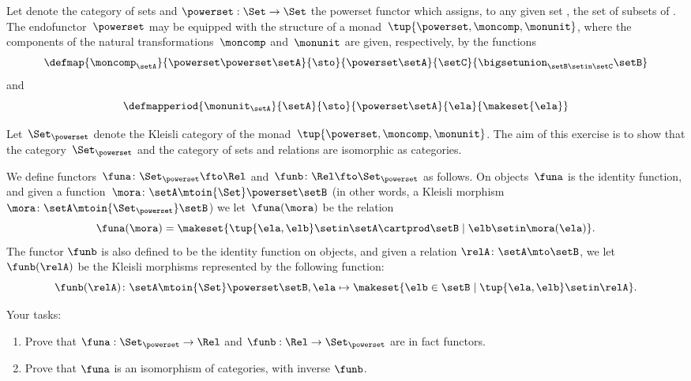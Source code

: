 \begin{gradedexercise}
    \label{ex:HwkRelKleisli}

    Let \Set denote the category of sets and $\powerset : \Set \to \Set$ the powerset functor which assigns, to any given set \setA, the set of subsets of \setA.
    The endofunctor~$\powerset$ may be equipped with the structure of a monad~$\tup{\powerset, \moncomp, \monunit}$, where the components of the natural transformations~$\moncomp$ and~$\monunit$ are given, respectively, by the functions
    \begin{equation}
        \defmap{\moncomp_{\setA}}{\powerset \powerset \setA}{\sto}{\powerset \setA}{\setC}{\bigsetunion_{\setB \setin \setC} \setB}
    \end{equation}
    and
    \begin{equation}
        \defmapperiod{\monunit_{\setA}}{\setA}{\sto}{\powerset \setA}{\ela}{\makeset{\ela}}
    \end{equation}

    Let~$\Set_{\powerset}$ denote the Kleisli category of the monad~$\tup{\powerset, \moncomp, \monunit}$.
    The aim of this exercise is to show that the category~$\Set_{\powerset}$ and the category \Rel of sets and relations are isomorphic as categories.

    We define functors~$\funa\colon \Set_{\powerset} \fto \Rel$ and~$\funb\colon \Rel \fto \Set_{\powerset}$ as follows.
    On objects~$\funa$ is the identity function, and given a function~$\mora \colon \setA \mtoin{\Set} \powerset \setB$ (in other words, a Kleisli morphism~$\mora \colon \setA \mtoin{\Set_{\powerset}} \setB$) we let~$\funa(\mora)$ be the relation
    \begin{equation}
        \funa(\mora) = \makeset{\tup{\ela, \elb} \setin \setA \cartprod \setB \mid \elb \setin \mora(\ela)}.
    \end{equation}
    The functor $\funb$ is also defined to be the identity function on objects, and given a relation $\relA \colon \setA \mto \setB$, we let $\funb(\relA)$ be the Kleisli morphisms represented by the following function:
    \begin{equation}
        \funb(\relA)\colon \setA \mtoin{\Set} \powerset \setB, \ela \mapsto \makeset{\elb \in \setB \mid \tup{\ela, \elb} \setin \relA}.
    \end{equation}

    Your tasks:
    \begin{enumerate}
        \item Prove that $\funa: \Set_{\powerset} \to \Rel$ and $\funb: \Rel \to \Set_{\powerset}$ are in fact functors.
        \item Prove that $\funa$ is an isomorphism of categories, with inverse $\funb$.
    \end{enumerate}
\end{gradedexercise}

